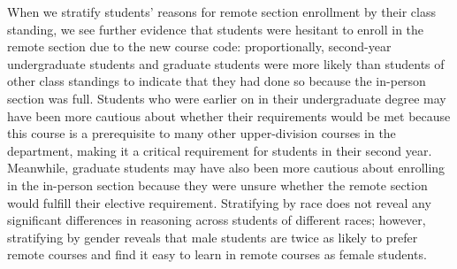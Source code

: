 When we stratify students' reasons for remote section enrollment by their class standing, we see further evidence that students were hesitant to enroll in the remote section due to the new course code: proportionally, second-year undergraduate students and graduate students were more likely than students of other class standings to indicate that they had done so because the in-person section was full. Students who were earlier on in their undergraduate degree may have been more cautious about whether their requirements would be met because this course is a prerequisite to many other upper-division courses in the department, making it a critical requirement for students in their second year. Meanwhile, graduate students may have also been more cautious about enrolling in the in-person section because they were unsure whether the remote section would fulfill their elective requirement. Stratifying by race does not reveal any significant differences in reasoning across students of different races; however, stratifying by gender reveals that male students are twice as likely to prefer remote courses and find it easy to learn in remote courses as female students.


